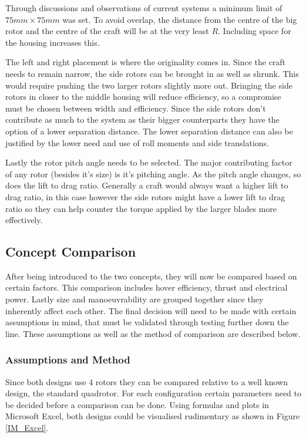 Through discussions and observations of current systems a minimum limit of $75mm \times 75mm$ was set. To avoid overlap, the distance from the centre of the big rotor and the centre of the craft will be at the very least $R$. Including space for the housing increases this.

The left and right placement is where the originality comes in. Since the craft needs to remain narrow, the side rotors can be brought in as well as shrunk. This would require pushing the two larger rotors slightly more out. Bringing the side rotors in closer to the middle housing will reduce efficiency, so a compromise must be chosen between width and efficiency. Since the side rotors don't contribute as much to the system as their bigger counterparts they have the option of a lower separation distance. The lower separation distance can also be justified by the lower need and use of roll moments and side translations.

Lastly the rotor pitch angle needs to be selected. The major contributing factor of any rotor (besides it's size) is it's pitching angle. As the pitch angle changes, so does the lift to drag ratio. Generally a craft would always want a higher lift to drag ratio, in this case however the side rotors might have a lower lift to drag ratio so they can help counter the torque applied by the larger blades more effectively.

\subsection{Concept Comparison}
After being introduced to the two concepts, they will now be compared based on certain factors. This comparison includes hover efficiency, thrust and electrical power. Lastly size and manoeuvrability are grouped together since they inherently affect each other. The final decision will need to be made with certain assumptions in mind, that must be validated through testing further down the line. These assumptions as well as the method of comparison are described below. 

\subsubsection{Assumptions and Method}
Since both designs use 4 rotors they can be compared relative to a well known design, the standard quadrotor. For each configuration certain parameters need to be decided before a comparison can be done. Using formulas and plots in Microsoft Excel\texttrademark, both designs could be visualised rudimentary as shown in Figure \ref{IM_Excel}.

